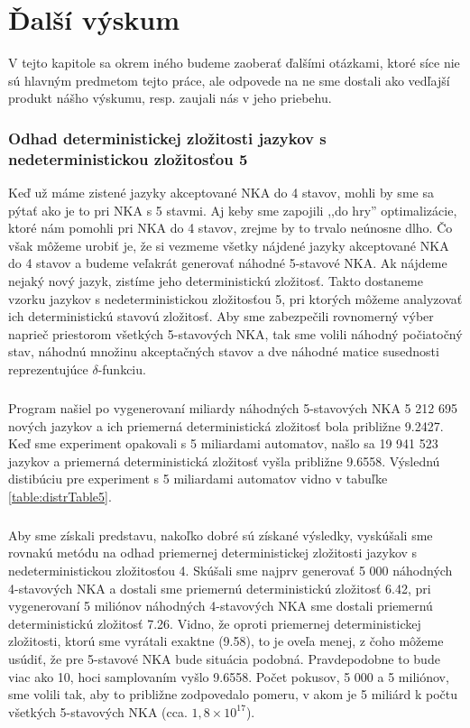 \chapter{Ďalší výskum}

V tejto kapitole sa okrem iného budeme zaoberať ďalšími otázkami, ktoré síce nie sú hlavným predmetom tejto práce, ale odpovede na ne sme dostali ako vedľajší produkt nášho výskumu, resp. zaujali nás v jeho priebehu.

\subsection{Odhad deterministickej zložitosti jazykov s nedeterministickou zložitosťou 5}

Keď už máme zistené jazyky akceptované NKA do 4 stavov, mohli by sme sa pýtať ako je to pri NKA s 5 stavmi. Aj keby sme zapojili ,,do hry'' optimalizácie, ktoré nám pomohli pri NKA do 4 stavov, zrejme by to trvalo neúnosne dlho. Čo však môžeme urobiť je, že si vezmeme všetky nájdené jazyky akceptované NKA do 4 stavov a budeme veľakrát generovať náhodné 5-stavové NKA. Ak nájdeme nejaký nový jazyk, zistíme jeho deterministickú zložitosť. Takto dostaneme vzorku jazykov s nedeterministickou zložitosťou 5, pri ktorých môžeme analyzovať ich deterministickú stavovú zložitosť. Aby sme zabezpečili rovnomerný výber naprieč priestorom všetkých 5-stavových NKA, tak sme volili náhodný počiatočný stav, náhodnú množinu akceptačných stavov a dve náhodné matice susednosti reprezentujúce $\delta$-funkciu.
\paragraph{}
Program našiel po vygenerovaní miliardy náhodných 5-stavových NKA 5 212 695 nových jazykov a ich priemerná deterministická zložitosť bola približne 9.2427. Keď sme experiment opakovali s 5 miliardami automatov, našlo sa 19 941 523 jazykov a priemerná deterministická zložitosť vyšla približne 9.6558. Výslednú distibúciu pre experiment s 5 miliardami automatov vidno v tabuľke \ref{table:distrTable5}.
\paragraph{}
Aby sme získali predstavu, nakoľko dobré sú získané výsledky, vyskúšali sme rovnakú metódu na odhad priemernej deterministickej zložitosti jazykov s nedeterministickou zložitosťou 4. Skúšali sme najprv generovať 5 000 náhodných 4-stavových NKA a dostali sme priemernú deterministickú zložitosť 6.42, pri vygenerovaní 5 miliónov náhodných 4-stavových NKA sme dostali priemernú deterministickú zložitosť 7.26. Vidno, že oproti priemernej deterministickej zložitosti, ktorú sme vyrátali exaktne (9.58), to je oveľa menej, z čoho môžeme usúdiť, že pre 5-stavové NKA bude situácia podobná. Pravdepodobne to bude viac ako 10, hoci samplovaním vyšlo 9.6558. Počet pokusov, 5 000 a 5 miliónov, sme volili tak, aby to približne zodpovedalo pomeru, v akom je 5 miliárd k počtu všetkých 5-stavových NKA (cca. $1,8\times10^{17}$).

